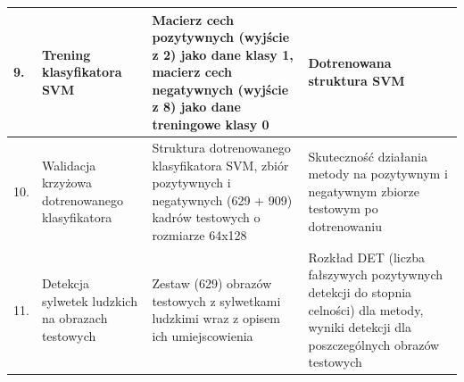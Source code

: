 \begin{center}
\begin{longtable}{ | l | p{4cm} | p{5cm} | p{5cm} |}
9. & Trening klasyfikatora SVM &
Macierz cech pozytywnych (wyjście z 2) jako dane klasy 1,  macierz
cech negatywnych (wyjście z 8) jako dane treningowe klasy 0 &
Dotrenowana struktura SVM\\ \hline

10. & Walidacja krzyżowa dotrenowanego klasyfikatora & Struktura
dotrenowanego klasyfikatora SVM,  zbiór pozytywnych i negatywnych
(629 + 909) kadrów testowych o rozmiarze 64x128 & Skuteczność
działania metody na pozytywnym i negatywnym zbiorze testowym po
dotrenowaniu \\ \hline

11. & Detekcja sylwetek ludzkich na obrazach testowych & Zestaw (629) obrazów testowych z sylwetkami ludzkimi wraz z opisem ich
umiejscowienia & Rozkład DET (liczba fałszywych pozytywnych detekcji do
stopnia celności) dla metody, wyniki detekcji dla poszczególnych
obrazów testowych\\ \hline
    
    \hline
    \end{longtable}
\end{center}